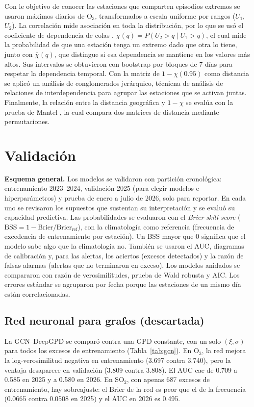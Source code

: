 \documentclass[11pt]{article}
\begin{document}
Con le objetivo de conocer las estaciones que comparten episodios extremos se usaron máximos diarios de O$_3$, transformados a escala uniforme por rangos ($U_1$, $U_2$). La correlación mide asociación en toda la distribución, por lo que se usó el coeficiente de dependencia de colas  \citep{coles1999}, $\chi(q) = P(U_2 > q \mid U_1 > q)$, el cual mide la probabilidad de que una estación tenga un extremo dado que otra lo tiene, junto con $\bar\chi(q)$, que distingue si esa dependencia se mantiene en los valores más altos. Sus intervalos se obtuvieron con bootstrap por bloques de 7 días para respetar la dependencia temporal. Con la matriz de  $1-\chi(0.95)$ como distancia se aplicó un análisis de conglomerados jerárquico, técnicna de análisis de relaciones de interdependencia para agrupar las estaciones que se activan juntas. Finalmente, la relación entre la distancia geográfica y $1-\chi$ se evalúa con la prueba de Mantel \citep{mantel1967}, la cual compara dos matrices de distancia mediante permutaciones. 


\section{Validación}

\textbf{Esquema general.} Los modelos se validaron con partición cronológica: entrenamiento 2023--2024, validación 2025 (para elegir modelos e hiperparámetros) y prueba de enero a julio de 2026, solo para reportar. En cada uno se revisaron los supuestos que sustentan su interpretación y se evaluó su capacidad predictiva. Las probabilidades se evaluaron con el \textit{Brier skill score} ($\mathrm{BSS} = 1 - \mathrm{Brier}/\mathrm{Brier}_{\mathrm{ref}}$), con la climatología como referencia (frecuencia de excedencia de entrenamiento por estación). Un BSS mayor que 0 significa que el modelo sabe algo que la climatología no. También se usaron el AUC, diagramas de calibración y, para las alertas, los aciertos (excesos detectados) y la razón de falsas alarmas (alertas que no terminaron en exceso). Los modelos anidados se compararon con razón de verosimilitudes, prueba de Wald robusta y AIC. Los errores estándar se agruparon por fecha porque las estaciones de un mismo día están correlacionadas.


\subsection{Red neuronal para grafos (descartada)}
\label{sec:val-gcn}
La GCN--DeepGPD se comparó contra una GPD constante, con un solo $(\xi,\sigma)$ para todos los excesos de entrenamiento (Tabla~\ref{tab:gcn}). En O$_3$, la red mejora la log-verosimilitud negativa en entrenamiento (3.697 contra 3.740), pero la ventaja desaparece en validación (3.809 contra 3.808). El AUC cae de 0.709 a 0.585 en 2025 y a 0.580 en 2026. En SO$_2$, con apenas 687 excesos de entrenamiento, hay sobreajuste: el Brier de la red es peor que el de la frecuencia (0.0665 contra 0.0508 en 2025) y el AUC en 2026 es 0.495.
\end{document}

